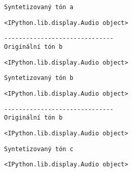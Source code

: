 \documentclass[11pt]{article}
\begin{document}
    
    \begin{Verbatim}[commandchars=\\\{\}]
Syntetizovaný tón a
    \end{Verbatim}

    
    \begin{Verbatim}[commandchars=\\\{\}]
<IPython.lib.display.Audio object>
    \end{Verbatim}

    
    \begin{Verbatim}[commandchars=\\\{\}]
------------------------------
Originální tón b
    \end{Verbatim}

    
    \begin{Verbatim}[commandchars=\\\{\}]
<IPython.lib.display.Audio object>
    \end{Verbatim}

    
    \begin{Verbatim}[commandchars=\\\{\}]
Syntetizovaný tón b
    \end{Verbatim}

    
    \begin{Verbatim}[commandchars=\\\{\}]
<IPython.lib.display.Audio object>
    \end{Verbatim}

    
    \begin{Verbatim}[commandchars=\\\{\}]
------------------------------
Originální tón b
    \end{Verbatim}

    
    \begin{Verbatim}[commandchars=\\\{\}]
<IPython.lib.display.Audio object>
    \end{Verbatim}

    
    \begin{Verbatim}[commandchars=\\\{\}]
Syntetizovaný tón c
    \end{Verbatim}

    
    \begin{Verbatim}[commandchars=\\\{\}]
<IPython.lib.display.Audio object>
    \end{Verbatim}
\end{document}
